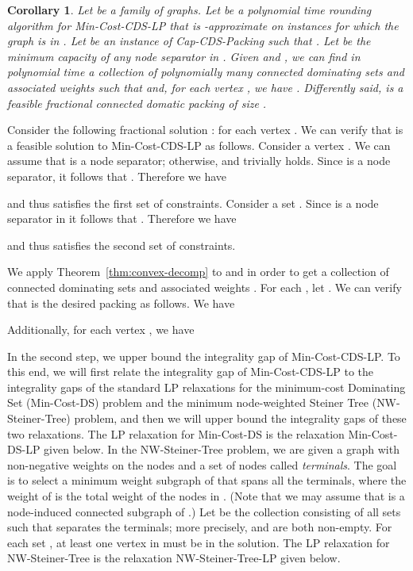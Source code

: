 \documentclass[11pt]{article}
\newtheorem{corollary}[lemma]{Corollary}
\renewenvironment{proof}{\vspace{-0.1in}\noindent{\bf Proof:}}{\hspace*{\fill}\par}
\def\prob#1{\textsf{\textup{#1}}\xspace}
\def\minDSlp{\prob{\minDS-LP}}
\def\minCDSlp{\prob{\minCDS-LP}}
\def\nwST{\prob{NW-Steiner-Tree}}
\def\nwSTlp{\prob{\nwST-LP}}
\def\capCDSpack{\prob{Cap-CDS-Packing}}
\def\minCDS{\prob{Min-Cost-CDS}}
\def\minDS{\prob{Min-Cost-DS}}
\begin{document}
\begin{corollary} \label{cor:cds-pack-decomp}
	Let  be a family of graphs. Let  be a polynomial time
	rounding algorithm for \minCDSlp that is -approximate on
	instances for which the graph is in .  Let  be an instance of \capCDSpack such that .
	Let  be the minimum capacity of any node separator in .
	Given  and , we can find in polynomial
	time a collection of polynomially many connected dominating sets
	 and associated weights  such that 
	and, for each vertex , we have . Differently said,  is a feasible
	fractional connected domatic packing of size .
\end{corollary}
\begin{proof}
	Consider the following fractional solution :  for each vertex . We can verify that
	 is a feasible solution to \minCDSlp as follows. Consider a
	vertex . We can assume that  is a node separator;
	otherwise,  and  trivially holds. Since  is a
	node separator, it follows that .
	Therefore we have
		
	and thus  satisfies the first set of constraints. Consider a
	set . Since  is a node separator in  it
	follows that . Therefore we have
		
	and thus  satisfies the second set of constraints.

	We apply Theorem~\ref{thm:convex-decomp} to  and  in
	order to get a collection of connected dominating sets  and associated weights . For each , let . We can verify that  is the desired packing as
	follows. We have
		
	Additionally, for each vertex , we have
		
\end{proof}

\medskip\noindent
In the second step, we upper bound the integrality gap of \minCDSlp.
To this end, we will first relate the integrality gap of \minCDSlp to
the integrality gaps of the standard LP relaxations for the
minimum-cost \prob{Dominating Set} (\minDS) problem and the minimum
node-weighted \prob{Steiner Tree} (\nwST) problem, and then we will
upper bound the integrality gaps of these two relaxations. The LP
relaxation for \minDS is the relaxation \minDSlp given below.  In the
\nwST problem, we are given a graph  with non-negative
weights  on the nodes and a set  of nodes called
\emph{terminals}. The goal is to select a minimum weight subgraph 
of  that spans all the terminals, where the weight of  is the
total weight of the nodes in . (Note that we may assume that 
is a node-induced connected subgraph of .) Let  be the
collection consisting of all sets  such that  separates the
terminals; more precisely,  and  are both
non-empty.  For each set , at least one vertex in
 must be in the solution. The LP relaxation for \nwST is
the relaxation \nwSTlp given below.
\end{document}
